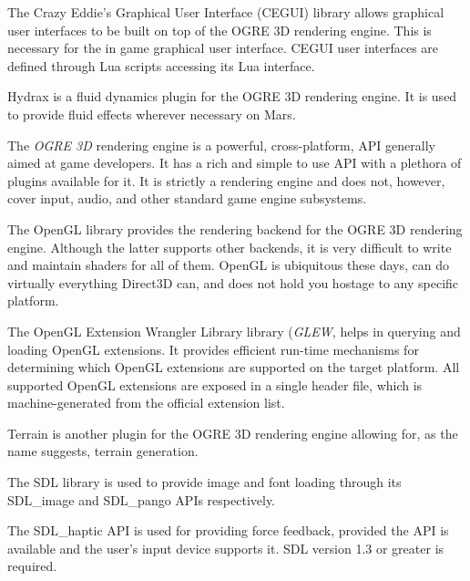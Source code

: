 The Crazy Eddie's Graphical User Interface (CEGUI) library allows graphical user interfaces to be built on top of the OGRE 3D rendering engine. This is necessary for the in game graphical user interface. CEGUI user interfaces are defined through Lua scripts accessing its Lua interface.


Hydrax is a fluid dynamics plugin for the OGRE 3D rendering engine. It is used to provide fluid effects wherever necessary on Mars.


The {\it OGRE 3D} rendering engine is a powerful, cross-platform, API generally aimed at game developers. It has a rich and simple to use API with a plethora of plugins available for it. It is strictly a rendering engine and does not, however, cover input, audio, and other standard game engine subsystems.


The OpenGL library provides the rendering backend for the OGRE 3D rendering engine. Although the latter supports other backends, it is very difficult to write and maintain shaders for all of them. OpenGL is ubiquitous these days, can do virtually everything Direct3D can, and does not hold you hostage to any specific platform.


The OpenGL Extension Wrangler Library library ({\it GLEW}, helps in querying and loading OpenGL extensions. It provides efficient run-time mechanisms for determining which OpenGL extensions are supported on the target platform. All supported OpenGL extensions are exposed in a single header file, which is machine-generated from the official extension list.


Terrain is another plugin for the OGRE 3D rendering engine allowing for, as the name suggests, terrain generation.


The SDL library is used to provide image and font loading through its SDL_image and SDL_pango APIs respectively.
\stopitemize


\startitemize[4]
\setupwhitespace[big]

The SDL_haptic API is used for providing force feedback, provided the API is available and the user's input device supports it. SDL version 1.3 or greater is required.

